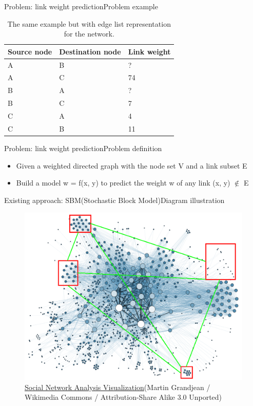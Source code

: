 \documentclass{beamer}
\begin{document}
\begin{frame}{Problem: link weight prediction}{Problem example}
	\begin{table}[H]\centering
		\caption{
			The same example but with edge list representation for the network.
		}
		\begin{tabularx}{\textwidth}{|X|X|X|}  \hline
			Source node & Destination node & Link weight \\ \hline
			A & B & ? \\ \hline
			A & C & 74 \\ \hline
			B & A & ? \\ \hline
			B & C & 7 \\ \hline
			C & A & 4 \\ \hline
			C & B & 11 \\ \hline
		\end{tabularx}
		\label{tab:example}
	\end{table}
\end{frame}

\begin{frame}{Problem: link weight prediction}{Problem definition}
	\begin{itemize}
		\item Given a weighted directed graph with the node set V and a link subset E
		\item Build a model w = f(x, y) to predict the weight w of any link (x, y) $ \notin $ E
	\end{itemize}
\end{frame}

\begin{frame}{Existing approach: SBM(Stochastic Block Model)}{Diagram illustration}
	\begin{figure}[H]
		\centering
		\includegraphics[width=0.7\linewidth]{SBM}
		\caption{ \href{https://commons.wikimedia.org/wiki/File:Social_Network_Analysis_Visualization.png}{Social Network Analysis Visualization}(Martin Grandjean / Wikimedia Commons / Attribution-Share Alike 3.0 Unported)}
		\label{fig:SBM}
	\end{figure}
\end{frame}
\end{document}
